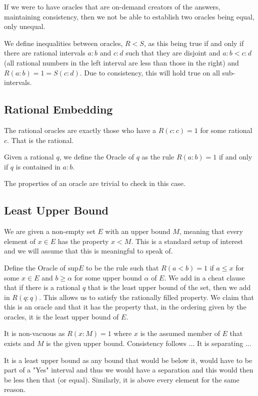 \documentclass[12pt]{article}
\theoremstyle{remark}
\begin{document}
If we were to have oracles that are on-demand creators of the answers, maintaining consistency, then we not be able to establish two oracles being equal, only unequal. 

We define inequalities between oracles, $R < S$, as this being true if and only if there are rational intervals $a:b$ and $c:d$ such that they are disjoint and $a:b < c:d$ (all rational numbers in the left interval are less than those in the right) and $R(a:b) = 1 = S(c:d)$. Due to consistency, this will hold true on all sub-intervals. 

\subsection{Rational Embedding}

The rational oracles are exactly those who have a $R(c:c)=1$ for some rational $c$. That is the rational.

Given a rational $q$, we define the Oracle of $q$ as the rule $R(a:b) = 1$ if and only if $q$ is contained in $a:b$. 

The properties of an oracle are trivial to check in this case. 



\subsection{Least Upper Bound}

We are given a non-empty set $E$ with an upper bound $M$, meaning that every element of $x \in E$ has the property $x < M$. This is a standard setup of interest and we will assume that this is meaningful to speak of.

Define the Oracle of $\mathrm{sup} E$ to be the rule such that $R(a<b) = 1$ if $a \leq x$ for some $x \in E$ and $b \geq \alpha$ for some upper bound $\alpha$ of $E$. We add in a cheat clause that if there is a rational $q$ that is the least upper bound of the set, then we add in $R(q:q)$. This allows us to satisfy the rationally filled property. We claim that this is an oracle and that it has the property that, in the ordering given by the oracles, it is the least upper bound of $E$. 

It is non-vacuous as $R(x:M) = 1$ where $x$ is the assumed member of $E$ that exists and $M$ is the given upper bound. Consistency follows ... It is separating ... 

It is a least upper bound as any bound that would be below it, would have to be part of a "Yes" interval and thus we would have a separation and this would then be less then that (or equal). Similarly, it is above every element for the same reason. 
\end{document}
